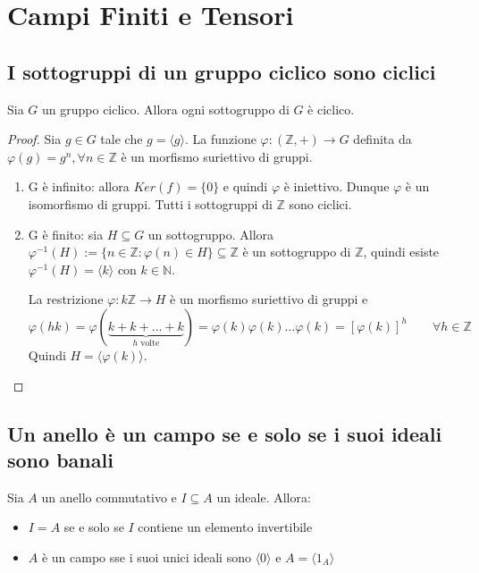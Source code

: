 \documentclass[10pt,a4paper,twoside]{book}
\begin{document}
\chapter{Campi Finiti e Tensori}

\section{I sottogruppi di un gruppo ciclico sono ciclici}

\begin{theorem}
    Sia $G$ un gruppo ciclico. Allora ogni sottogruppo di $G$ è ciclico.
\end{theorem}

\begin{proof}
    Sia $g \in G$ tale che $g = \langle g \rangle$. La funzione $\varphi: (\mathbb{Z} , +) \rightarrow G$ definita da $\varphi(g) = g^n, \forall n \in \mathbb{Z}$ è un morfismo suriettivo di gruppi.
    \begin{enumerate}[label=\alph*)]
        \item G è infinito: allora $Ker(f) = \{0\}$ e quindi $\varphi$ è iniettivo. Dunque $\varphi$ è un
              isomorfismo di gruppi. Tutti i sottogruppi di $\mathbb{Z} $ sono ciclici.
        \item G è finito: sia $H \subseteq G$ un sottogruppo. Allora $\varphi^{-1}(H) := \{n \in \mathbb{Z} : \varphi(n) \in H\} \subseteq \mathbb{Z} $ è un sottogruppo di $\mathbb{Z} $, quindi esiste $\varphi^{-1}(H)= \langle k \rangle$ con $k \in \mathbb{N} $.

              La restrizione $\varphi: k \mathbb{Z} \rightarrow H$ è un morfismo suriettivo di gruppi e
              \begin{equation*}
                  \varphi(hk) = \varphi(\underbrace{k+k+\ldots+k}_{h \text{ volte}}) = \varphi(k) \varphi(k) \ldots \varphi(k) = [\varphi(k)]^h \qquad \forall h \in \mathbb{Z}
              \end{equation*}
              Quindi $H = \langle \varphi(k) \rangle$.
    \end{enumerate}
\end{proof}

\newpage

\section{Un anello è un campo se e solo se i suoi ideali sono banali}
\begin{proposition}
    Sia $A$ un anello commutativo e $I \subseteq A$ un ideale. Allora:
    \begin{itemize}
        \item $I = A$ se e solo se $I$ contiene un elemento invertibile
        \item $A$ è un campo sse i suoi unici ideali sono $\langle 0 \rangle$ e $A = \langle 1_A \rangle$
    \end{itemize}
\end{proposition}
\end{document}
